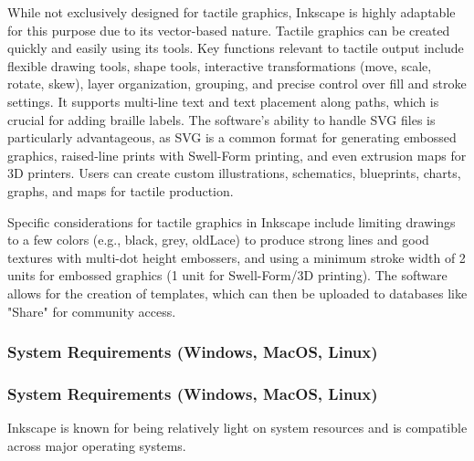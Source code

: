 While not exclusively designed for tactile graphics, Inkscape is highly adaptable for this purpose due to its vector-based nature. Tactile graphics can be created quickly and easily using its tools. \cite{GetBraille} Key functions relevant to tactile output include flexible drawing tools, shape tools, interactive transformations (move, scale, rotate, skew), layer organization, grouping, and precise control over fill and stroke settings. \cite{DuxburyFAQ13} It supports multi-line text and text placement along paths, which is crucial for adding braille labels. \cite{DuxburyFAQ13} The software's ability to handle SVG files is particularly advantageous, as SVG is a common format for generating embossed graphics, raised-line prints with Swell-Form printing, and even extrusion maps for 3D printers. \cite{ProBlindCreate} Users can create custom illustrations, schematics, blueprints, charts, graphs, and maps for tactile production. \cite{ProBlindCreate}

Specific considerations for tactile graphics in Inkscape include limiting drawings to a few colors (e.g., black, grey, oldLace) to produce strong lines and good textures with multi-dot height embossers, and using a minimum stroke width of 2 units for embossed graphics (1 unit for Swell-Form/3D printing). \cite{ProBlindCreate} The software allows for the creation of templates, which can then be uploaded to databases like "Share" for community access. \cite{GetBraille}

\subsubsection{System Requirements (Windows, MacOS, Linux)}

\subsubsection{System Requirements (Windows, MacOS, Linux)}

Inkscape is known for being relatively light on system resources and is compatible across major operating systems. \cite{BlindHelpDBT}

